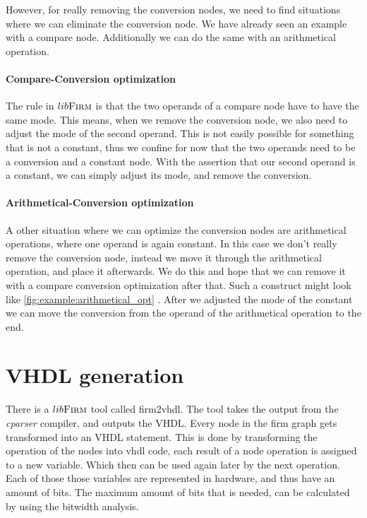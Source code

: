 However, for really removing the conversion nodes, we need to find situations where we can eliminate the conversion node. We have already seen an example with a compare node. Additionally we can do the same with an arithmetical operation.

\paragraph{Compare-Conversion optimization}
The rule in $lib\textsc{Firm}$ is that the two operands of a compare node have to have the same mode. This means, when we remove the conversion node, we also need to adjust the mode of the second operand. This is not easily possible for something that is not a constant, thus we confine for now that the two operands need to be a conversion and a constant node.
With the assertion that our second operand is a constant, we can simply adjust its mode, and remove the conversion.

\paragraph{Arithmetical-Conversion optimization}

A other situation where we can optimize the conversion nodes are arithmetical operations, where one operand is again constant. In this case we don't really remove the conversion node, instead we move it through the arithmetical operation, and place it afterwards. We do this and hope that we can remove it with a compare conversion optimization after that.
Such a construct might look like \autoref{fig:example:arithmetical_opt} . After we adjusted the mode of the constant we can move the conversion from the operand of the arithmetical operation to the end.
\section{VHDL generation}

There is a $lib\textsc{Firm}$ tool called firm2vhdl. The tool takes the output from the \textit{cparser} compiler, and outputs the VHDL. Every node in the firm graph gets transformed into an VHDL statement. This is done by transforming the operation of the nodes into vhdl code, each result of a node operation is assigned to a new variable. Which then can be used again later by the next operation. 
Each of those those variables are represented in hardware, and thus have an amount of bits. The maximum amount of bits that is needed, can be calculated by using the bitwidth analysis.

